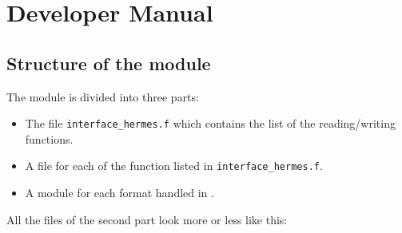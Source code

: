 \section{Developer Manual}
%

%
\subsection{Structure of the module}
%
The module is divided into three parts:
\begin{itemize}
\item The file \verb!interface_hermes.f! which contains the list of the
reading/writing functions.
\item A file for each of the function listed in \verb!interface_hermes.f!.
\item A module for each format handled in \telemacsystem.
\end{itemize}
%
All the files of the second part look more or less like this:
